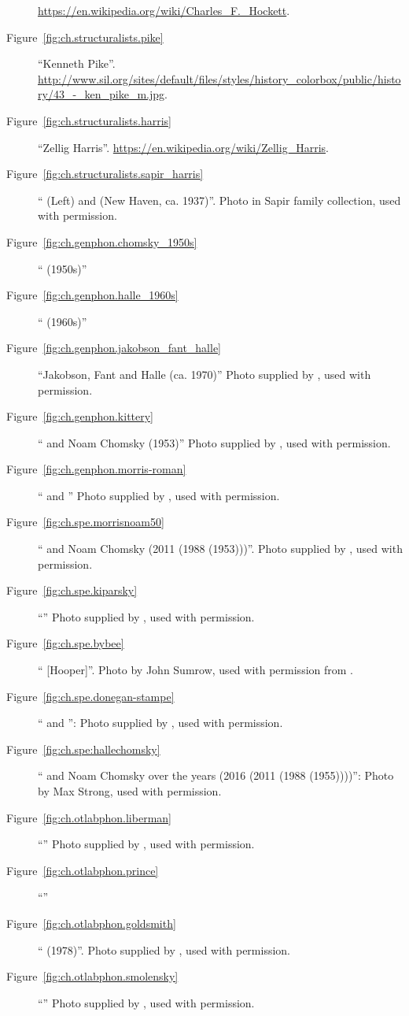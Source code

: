 \begin{description}
  \url{https://en.wikipedia.org/wiki/Charles_F._Hockett}.
\item[Figure~\ref{fig:ch.structuralists.pike}] ``Kenneth
  Pike''. 
  \url{http://www.sil.org/sites/default/files/styles/history_colorbox/public/history/43_-_ken_pike_m.jpg}.
\item[Figure~\ref{fig:ch.structuralists.harris}] ``Zellig
  Harris''. \url{https://en.wikipedia.org/wiki/Zellig_Harris}.
\item[Figure~\ref{fig:ch.structuralists.sapir_harris}] `` (Left)
  and  (New Haven, ca. 1937)''. Photo in Sapir family
  collection, used with permission.
\item[Figure~\ref{fig:ch.genphon.chomsky_1950s}] ``
  (1950s)''
\item[Figure~\ref{fig:ch.genphon.halle_1960s}] ``
  (1960s)''
\item[Figure~\ref{fig:ch.genphon.jakobson_fant_halle}] ``Jakobson,
  Fant and Halle (ca. 1970)'' Photo supplied by , used with
  permission.
\item[Figure~\ref{fig:ch.genphon.kittery}] `` and Noam
  Chomsky (1953)'' Photo supplied by , used
  with permission.
\item[Figure~\ref{fig:ch.genphon.morris-roman}] `` and
  '' Photo supplied by , used with
  permission.
\item[Figure~\ref{fig:ch.spe.morrisnoam50}] `` and Noam
  Chomsky (2011 (1988 (1953)))''. Photo supplied by , used
  with permission.
\item[Figure~\ref{fig:ch.spe.kiparsky}] ``'' Photo
  supplied by , used with permission.
\item[Figure~\ref{fig:ch.spe.bybee}] `` [Hooper]''. Photo
  by John Sumrow, used with permission from .
\item[Figure~\ref{fig:ch.spe.donegan-stampe}] `` and
  '': Photo supplied by , used with permission.
\item[Figure~\ref{fig:ch.spe:hallechomsky}] `` and Noam
  Chomsky over the years (2016 (2011 (1988 (1955))))'': Photo by Max
  Strong, used with permission.
\item[Figure~\ref{fig:ch.otlabphon.liberman}] ``'' Photo
supplied by , used with permission.
\item[Figure~\ref{fig:ch.otlabphon.prince}] ``''
\item[Figure~\ref{fig:ch.otlabphon.goldsmith}] ``
  (1978)''. Photo supplied by , used with permission.
\item[Figure~\ref{fig:ch.otlabphon.smolensky}] ``''
  Photo supplied by , used with permission.
\end{description}


